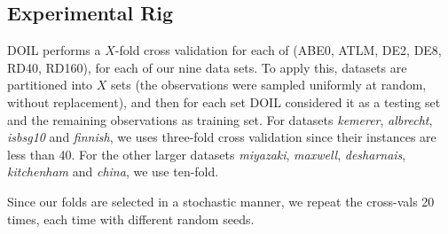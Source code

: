\documentclass[10pt,conference]{IEEEtran}
\newcommand{\ei}{\end{itemize}}
\begin{document}
% 

 
 
 \subsection{Experimental Rig}
DOIL performs a  $X$-fold cross validation for each of (ABE0, ATLM, DE2, DE8, RD40, RD160), for each of our nine data sets.  To apply this, datasets are partitioned into 
$X$ sets (the observations were sampled uniformly at random, without replacement),
 and then for each set DOIL considered it as a testing set and the remaining 
 observations as training set. For datasets \textit{kemerer}, \textit{albrecht}, \textit{isbsg10} and \textit{finnish}, 
we uses three-fold cross validation since their instances are less than 40. For the other  larger datasets \textit{miyazaki}, \textit{maxwell}, \textit{desharnais}, \textit{kitchenham} and \textit{china},  we use ten-fold. 

Since our folds are selected in a stochastic manner, we repeat the cross-vals 20 times, each time with different random seeds.

 





 
\end{document}
